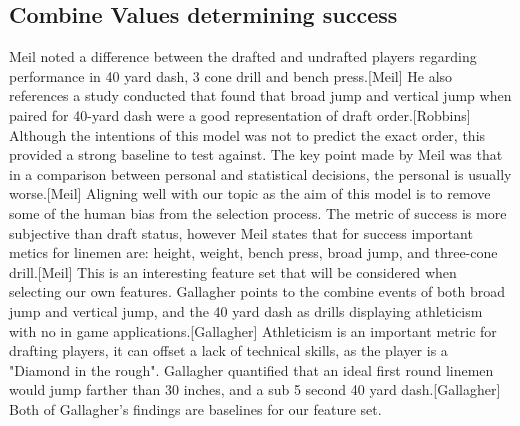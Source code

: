 \documentclass[confrence]{IEEEtran}
\begin{document}
\subsection*{Combine Values determining success}
Meil noted a difference between the drafted and undrafted players regarding performance in 40 yard dash, 3 cone drill and bench press.[Meil]
He also references a study conducted that found that broad jump and vertical jump when paired for 40-yard dash were a good representation of draft order.[Robbins]
Although the intentions of this model was not to predict the exact order, this provided a strong baseline to test against.
The key point made by Meil was that in a comparison between personal and statistical decisions, the personal is usually worse.[Meil]
Aligning well with our topic as the aim of this model is to remove some of the human bias from the selection process.
The metric of success is more subjective than draft status, however Meil states that for success important metics for linemen are: height, weight, bench press, broad jump, and three-cone drill.[Meil]
This is an interesting feature set that will be considered when selecting our own features.
Gallagher points to the combine events of both broad jump and vertical jump, and the 40 yard dash as drills displaying athleticism with no in game applications.[Gallagher]
Athleticism is an important metric for drafting players, it can offset a lack of technical skills, as the player is a "Diamond in the rough".
Gallagher quantified that an ideal first round linemen would jump farther than 30 inches, and a sub 5 second 40 yard dash.[Gallagher]
Both of Gallagher's findings are baselines for our feature set.
\end{document}
